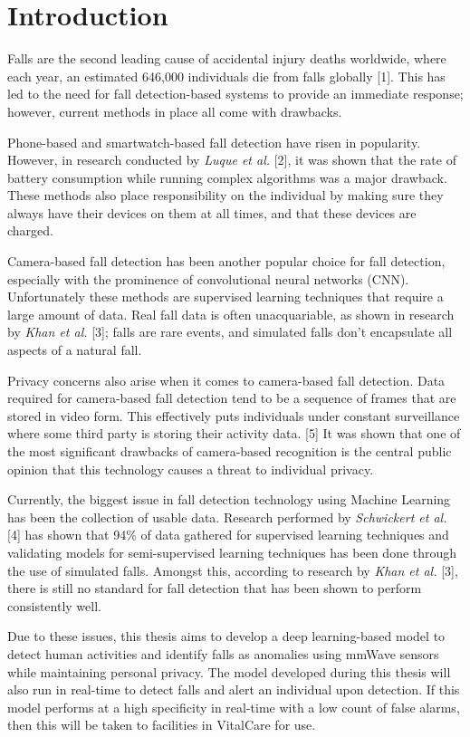 \chapter{Introduction}\label{ch:intro}

Falls are the second leading cause of accidental injury deaths worldwide, where each year, an estimated 646,000 individuals die from falls globally [1]. This has led to the need for fall detection-based systems to provide an immediate response; however, current methods in place all come with drawbacks. 

Phone-based and smartwatch-based fall detection have risen in popularity. However, in research conducted by \textit{Luque et al.} [2], it was shown that the rate of battery consumption while running complex algorithms was a major drawback. These methods also place responsibility on the individual by making sure they always have their devices on them at all times, and that these devices are charged.

Camera-based fall detection has been another popular choice for fall detection, especially with the prominence of convolutional neural networks (CNN). Unfortunately these methods are supervised learning techniques that require a large amount of data. Real fall data is often unacquariable, as shown in research by \textit{Khan et al.} [3]; falls are rare events, and simulated falls don't encapsulate all aspects of a natural fall.

Privacy concerns also arise when it comes to camera-based fall detection. Data required for camera-based fall detection tend to be a sequence of frames that are stored in video form. This effectively puts individuals under constant surveillance where some third party is storing their activity data. [5] It was shown that one of the most significant drawbacks of camera-based recognition is the central public opinion that this technology causes a threat to individual privacy.

Currently, the biggest issue in fall detection technology using Machine Learning has been the collection of usable data. Research performed by \textit{Schwickert et al.} [4] has shown that 94\% of data gathered for supervised learning techniques and validating models for semi-supervised learning techniques has been done through the use of simulated falls. Amongst this, according to research by \textit{Khan et al.} [3], there is still no standard for fall detection that has been shown to perform consistently well.

Due to these issues, this thesis aims to develop a deep learning-based model to detect human activities and identify falls as anomalies using mmWave sensors while maintaining personal privacy. The model developed during this thesis will also run in real-time to detect falls and alert an individual upon detection. If this model performs at a high specificity in real-time with a low count of false alarms, then this will be taken to facilities in VitalCare for use.  

